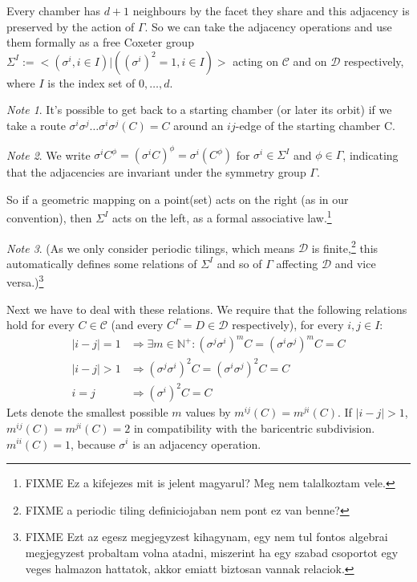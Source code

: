 \documentclass[12pt,a4paper]{article}
\numberwithin{equation}{section}
\theoremstyle{plain}%
\theoremstyle{definition}
\theoremstyle{remark}
\newtheorem*{note}{Note}
\begin{document}
Every chamber has $d+1$ neighbours by the facet they share and this adjacency is
preserved by the action of $\Gamma$. So we can take the adjacency operations and
use them formally as a free Coxeter group $\Sigma^I := <(\sigma^i, i\in I) |
((\sigma^i)^2=1, i\in I)>$ acting on $\mathcal{C}$ and on $\mathcal{D}$
respectively, where $I$ is the index set of $0,\ldots,d$. 

\begin{note}
  It's possible to get back to a starting chamber (or later its orbit) if we
  take a route $\sigma^i\sigma^j\ldots\sigma^i\sigma^j(C) = C$ around an
  $ij$-edge of the starting chamber C.
\end{note}

\begin{note}
  We write $\sigma^iC^\phi=(\sigma^iC)^\phi=\sigma^i(C^\phi)$ for
  $\sigma^i\in\Sigma^I$ and $\phi\in\Gamma$, indicating that the adjacencies are
  invariant under the symmetry group $\Gamma$.
  
  So if a geometric mapping on a point(set) acts on the right (as in our
  convention), then $\Sigma^I$ acts on the left, as a formal associative
  law.\footnote{FIXME Ez a kifejezes mit is jelent magyarul? Meg nem talalkoztam
  vele.}
\end{note}

\begin{note}
(As we only consider periodic tilings, which means $\mathcal{D}$ is
finite,\footnote{FIXME a periodic tiling definiciojaban nem pont ez van benne?} this
automatically defines some relations of $\Sigma^I$ and so of $\Gamma$ affecting
$\mathcal{D}$ and vice versa.)\footnote{FIXME Ezt az egesz megjegyzest
kihagynam, egy nem tul fontos algebrai megjegyzest probaltam volna atadni,
miszerint ha egy szabad csoportot egy veges halmazon hattatok, akkor emiatt biztosan
vannak relaciok.}
\end{note}

Next we have to deal with these relations. We require that the following
relations hold for every $C\in\mathcal{C}$ (and every $C^\Gamma=D\in\mathcal{D}$
respectively), for every $i,j\in I$:
\begin{align}
  \label{eqn:mxfun_constraint_begin}|i-j|=1 & \Rightarrow \exists m\in\mathbb{N}^+: (\sigma^j\sigma^i)^mC=(\sigma^i\sigma^j)^mC=C \\
  |i-j|>1 & \Rightarrow (\sigma^j\sigma^i)^2C=(\sigma^i\sigma^j)^2C=C \\
  i=j & \Rightarrow (\sigma^i)^2C=C
\end{align}
Lets denote the smallest possible $m$ values by $m^{ij}(C)=m^{ji}(C)$.
If $|i-j|>1$, $m^{ij}(C)=m^{ji}(C)=2$ in compatibility with the baricentric subdivision.  
$m^{ii}(C)=1$, because $\sigma^i$ is an adjacency operation.
\end{document}
